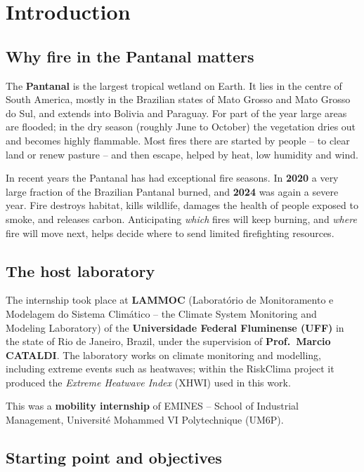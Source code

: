 \documentclass[11pt,a4paper,oneside]{report}
\begin{document}
\chapter{Introduction}

\section{Why fire in the Pantanal matters}

The \textbf{Pantanal} is the largest tropical wetland on Earth. It lies in the
centre of South America, mostly in the Brazilian states of Mato Grosso and Mato
Grosso do Sul, and extends into Bolivia and Paraguay. For part of the year large
areas are flooded; in the dry season (roughly June to October) the vegetation
dries out and becomes highly flammable. Most fires there are started by people
-- to clear land or renew pasture -- and then escape, helped by heat, low
humidity and wind.

In recent years the Pantanal has had exceptional fire seasons. In \textbf{2020} a
very large fraction of the Brazilian Pantanal burned, and \textbf{2024} was again
a severe year. Fire destroys habitat, kills wildlife, damages the health of
people exposed to smoke, and releases carbon. Anticipating \emph{which} fires
will keep burning, and \emph{where} fire will move next, helps decide where to
send limited firefighting resources.

\section{The host laboratory}

The internship took place at \textbf{LAMMOC} (Laboratório de Monitoramento e
Modelagem do Sistema Climático -- the Climate System Monitoring and Modeling
Laboratory) of the \textbf{Universidade Federal Fluminense (UFF)} in the state of
Rio de Janeiro, Brazil, under the supervision of \textbf{Prof.\ Marcio CATALDI}.
The laboratory works on climate monitoring and modelling, including extreme
events such as heatwaves; within the RiskClima project it produced the
\emph{Extreme Heatwave Index} (XHWI) used in this work.

This was a \textbf{mobility internship} of EMINES -- School of Industrial
Management, Université Mohammed VI Polytechnique (UM6P).

\section{Starting point and objectives}
\end{document}
